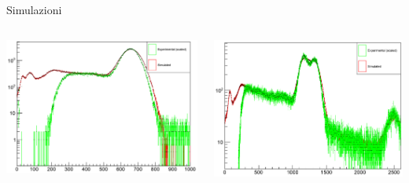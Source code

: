 \documentclass [xcolor=svgnames, 9pt] {beamer}
\begin{document}
\begin{frame}{Simulazioni}%
	\begin{columns}
		\begin{column}{0.45\textwidth}
			\centering
			\includegraphics[width=\textwidth]{img/Caesium_scaled.pdf}
			
		\end{column}
	\begin{column}{0.45\textwidth}
		\centering
			\includegraphics[width=\textwidth]{img/Cobalt_scaled.pdf}
	\end{column}%
	\end{columns}
\begin{table}[h]
		\centering
		

\end{table}
\end{frame}
\end{document}
